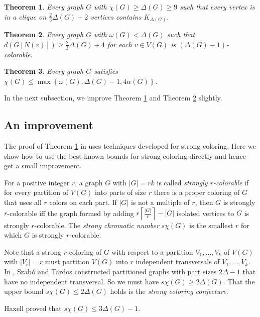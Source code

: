 \documentclass[12pt]{article}
\theoremstyle{plain}
\newtheorem{thm}{Theorem}
\theoremstyle{definition}
\theoremstyle{remark}
\newcommand{\set}[1]{\left\{ #1 \right\}}
\newcommand{\card}[1]{\left|#1\right|}
\newcommand{\ceil}[1]{\left\lceil#1\right\rceil}
\begin{document}
\begin{thm}\label{TwoThirdsCliqueCor}
Every graph $G$ with $\chi(G) \geq \Delta(G) \geq 9$ such that every
vertex is in a clique on $\frac23\Delta(G) + 2$ vertices contains $K_{\Delta(G)}$.
\end{thm}

\begin{thm}\label{BKdense}
Every graph $G$ with $\omega(G) < \Delta(G)$ such that $d(G[N(v)]) \geq \frac23\Delta(G) + 4$ for each $v \in V(G)$ is $(\Delta(G)-1)$-colorable.
\end{thm}

\begin{thm}
Every graph $G$ satisfies $\chi(G) \le \max\set{\omega(G), \Delta(G) - 1, 4\alpha(G)}$.
\end{thm}

In the next subsection, we improve Theorem \ref{TwoThirdsCliqueCor} and Theorem \ref{BKdense} slightly.

\subsection{An improvement}
The proof of Theorem \ref{TwoThirdsCliqueCor} in \cite{denseneighborhoods} uses techniques developed for strong coloring.  
Here we show how to use the best known bounds for strong coloring directly and hence get a small improvement.

For a positive integer $r$, a graph $G$ with $\card{G} = rk$ is called \emph{strongly $r$-colorable} if for every partition 
of $V(G)$ into parts of size $r$ there is a proper coloring of $G$ that uses all $r$ colors on each part.  
If $\card{G}$ is not a multiple of $r$, then $G$ is strongly $r$-colorable iff the graph formed by adding $r\ceil{\frac{|G|}{r}} - |G|$ isolated vertices to $G$ is strongly $r$-colorable.  
The \emph{strong chromatic number} $s\chi(G)$ is the smallest $r$ for which $G$ is strongly $r$-colorable.

Note that a strong $r$-coloring of $G$ with respect to a partition $V_1, \ldots, V_k$ of $V(G)$ with $\card{V_i} = r$ must partition $V(G)$ into $r$ 
independent transversals of $V_1, \ldots, V_k$. In \cite{szabo2006extremal}, Szab{\'o} and Tardos constructed partitioned graphs with part sizes $2\Delta - 1$ 
that have no independent transversal.  So we must have $s\chi(G) \geq 2\Delta(G)$.  That the upper bound $s\chi(G) \le 2\Delta(G)$ holds is the \emph{strong coloring conjecture}.

Haxell \cite{haxell2004strong} proved that $s\chi(G) \leq 3\Delta(G) - 1$.  
\end{document}
